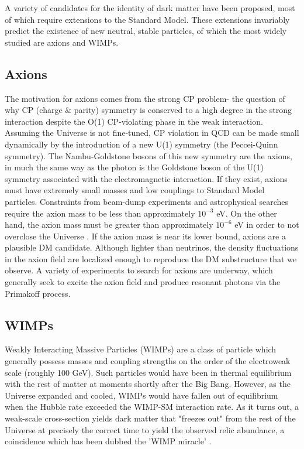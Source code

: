 A variety of candidates for the identity of dark matter have been proposed, most of which require extensions to the Standard Model. 
These extensions invariably predict the existence of new neutral, stable particles, of which the most widely studied are axions and WIMPs.

\subsection{Axions}
The motivation for axions comes from the strong CP problem- the question of why CP (charge \& parity) symmetry is conserved to a high degree in the strong interaction despite the O(1) CP-violating phase in the weak interaction. Assuming the Universe is not fine-tuned, CP violation in QCD can be made small dynamically by the introduction of a new U(1) symmetry (the Peccei-Quinn symmetry). The Nambu-Goldstone bosons of this new symmetry are the axions, in much the same way as the photon is the Goldstone boson of the U(1) symmetry associated with the electromagnetic interaction. 
If they exist, axions must have extremely small masses and low couplings to Standard Model particles. Constraints from beam-dump experiments and astrophysical searches require the axion mass to be less than approximately $10^{-3}$ eV. On the other hand, the axion mass must be greater than approximately $10^{-6}$ eV in order to not overclose the Universe \cite{bertone_particle_2010}. If the axion mass is near its lower bound, axions are a plausible DM candidate. Although lighter than neutrinos, the density fluctuations in the axion field are localized enough to reproduce the DM substructure that we observe. A variety of experiments to search for axions are underway, which generally seek to excite the axion field and produce resonant photons via the Primakoff process. 

\subsection{WIMPs}
Weakly Interacting Massive Particles (WIMPs) are a class of particle which generally possess masses and coupling strengths on the order of the electroweak scale (roughly 100 GeV). 
Such particles would have been in thermal equilibrium with the rest of matter at moments shortly after the Big Bang.
However, as the Universe expanded and cooled, WIMPs would have fallen out of equilibrium when the Hubble rate exceeded the WIMP-SM interaction rate. 
As it turns out, a weak-scale cross-section yields dark matter that "freezes out" from the rest of the Universe at precisely the correct time to yield the observed relic abundance, a coincidence which has been dubbed the 'WIMP miracle' \cite{bertone_particle_2010}.

